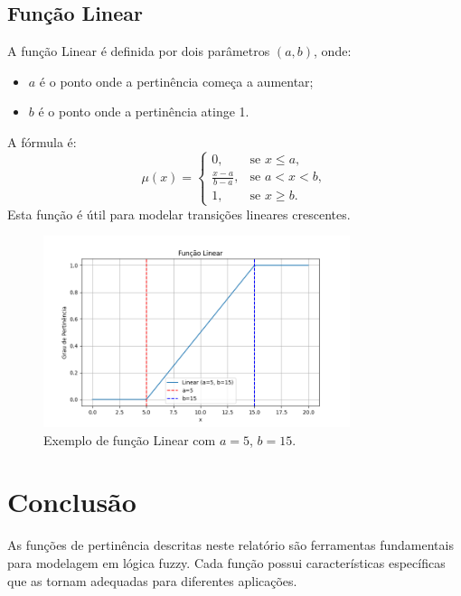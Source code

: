 \documentclass[a4paper,12pt]{article}
\begin{document}
\subsection{Função Linear}
A função Linear é definida por dois parâmetros $(a, b)$, onde:
\begin{itemize}
    \item $a$ é o ponto onde a pertinência começa a aumentar;
    \item $b$ é o ponto onde a pertinência atinge 1.
\end{itemize}
A fórmula é:
\[
\mu(x) =
\begin{cases}
0, & \text{se } x \leq a, \\
\frac{x - a}{b - a}, & \text{se } a < x < b, \\
1, & \text{se } x \geq b.
\end{cases}
\]
Esta função é útil para modelar transições lineares crescentes.
\begin{figure}[H]
    \centering
    \includegraphics[width=0.8\textwidth]{img/linear.png}
    \caption{Exemplo de função Linear com $a=5$, $b=15$.}
\end{figure}

\section{Conclusão}
As funções de pertinência descritas neste relatório são ferramentas fundamentais para modelagem em lógica fuzzy. Cada função possui características específicas que as tornam adequadas para diferentes aplicações.
\end{document}
